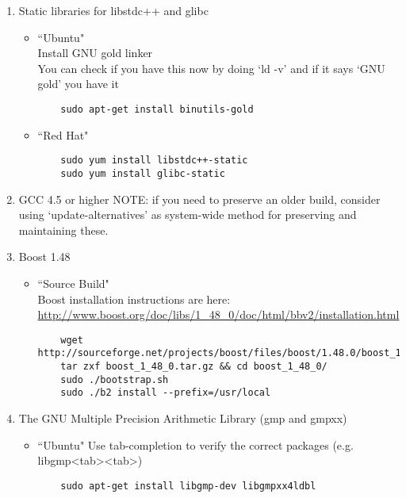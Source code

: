 \begin{enumerate}
  \item Static libraries for libstdc++ and glibc

  \begin{itemize}
    \item ``Ubuntu" \\
    Install GNU gold linker \\
    You can check if you have this now by doing `ld -v' and if it says `GNU gold' you have it
    \begin{lstlisting}
    sudo apt-get install binutils-gold
    \end{lstlisting}

    \item ``Red Hat"
    \begin{lstlisting}
    sudo yum install libstdc++-static 
    sudo yum install glibc-static
    \end{lstlisting}
  \end{itemize}
  
  \item GCC 4.5 or higher
  NOTE: if you need to preserve an older build, consider using `update-alternatives' as system-wide method for preserving and maintaining these.

  \item Boost 1.48
  \begin{itemize}
    \item ``Source Build" \\
    Boost installation instructions are here: \\
    \url{http://www.boost.org/doc/libs/1_48_0/doc/html/bbv2/installation.html}
    \begin{lstlisting}
    wget http://sourceforge.net/projects/boost/files/boost/1.48.0/boost_1_48_0.tar.gz
    tar zxf boost_1_48_0.tar.gz && cd boost_1_48_0/
    sudo ./bootstrap.sh
    sudo ./b2 install --prefix=/usr/local
    \end{lstlisting}
  \end{itemize}

  \item The GNU Multiple Precision Arithmetic Library (gmp and gmpxx)    
  \begin{itemize}
    \item ``Ubuntu"
    Use tab-completion to verify the correct packages (e.g. libgmp<tab><tab>)
    \begin{lstlisting}
    sudo apt-get install libgmp-dev libgmpxx4ldbl
    \end{lstlisting}


\end{itemize}
\end{enumerate}
